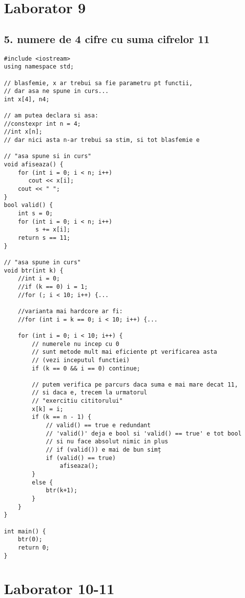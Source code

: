 \documentclass[11pt]{article}
\begin{document}
\section*{Laborator 9}
\label{sec:org8cc3ee4}
\subsection*{5. numere de 4 cifre cu suma cifrelor 11}
\label{sec:org2760a11}
\begin{verbatim}
#include <iostream>
using namespace std;

// blasfemie, x ar trebui sa fie parametru pt functii,
// dar asa ne spune in curs...
int x[4], n4;

// am putea declara si asa:
//constexpr int n = 4;
//int x[n];
// dar nici asta n-ar trebui sa stim, si tot blasfemie e

// "asa spune si in curs"
void afiseaza() {
    for (int i = 0; i < n; i++)
       cout << x[i];
    cout << " ";
}
bool valid() {
    int s = 0;
    for (int i = 0; i < n; i++)
         s += x[i];
    return s == 11;
}

// "asa spune in curs"
void btr(int k) {
    //int i = 0;
    //if (k == 0) i = 1;
    //for (; i < 10; i++) {...

    //varianta mai hardcore ar fi:
    //for (int i = k == 0; i < 10; i++) {...

    for (int i = 0; i < 10; i++) {
        // numerele nu incep cu 0
        // sunt metode mult mai eficiente pt verificarea asta
        // (vezi inceputul functiei)
        if (k == 0 && i == 0) continue;

        // putem verifica pe parcurs daca suma e mai mare decat 11,
        // si daca e, trecem la urmatorul
        // "exercitiu cititorului"
        x[k] = i;
        if (k == n - 1) {
            // valid() == true e redundant
            // 'valid()' deja e bool si 'valid() == true' e tot bool
            // si nu face absolut nimic in plus
            // if (valid()) e mai de bun simț
            if (valid() == true)
                afiseaza();
        }
        else {
            btr(k+1);
        }
    }  
}

int main() {
    btr(0);
    return 0;
}
\end{verbatim}

\pagebreak
\section*{Laborator 10-11}
\label{sec:orgb67e521}
\end{document}
